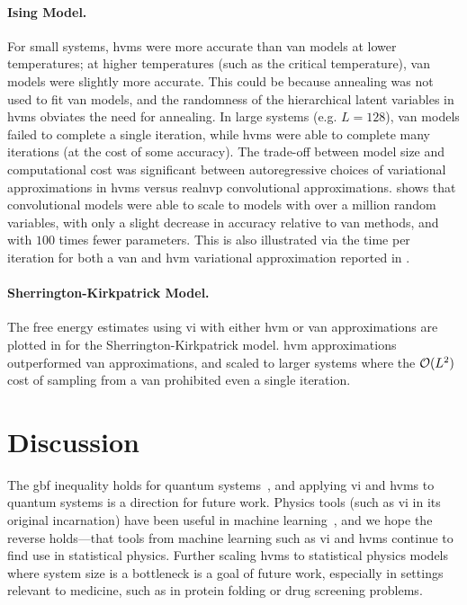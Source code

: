 \paragraph{Ising Model.} For small systems, \glspl{hvm} were more accurate than \gls{van} models at lower temperatures; at higher temperatures (such as the critical temperature), \gls{van} models were slightly more accurate. This could be because annealing was not used to fit \gls{van} models, and the randomness of the hierarchical latent variables in \glspl{hvm} obviates the need for annealing. In large systems (e.g. $L=128$), \gls{van} models failed to complete a single iteration, while \glspl{hvm} were able to complete many iterations (at the cost of some accuracy). The trade-off between model size and computational cost was significant between autoregressive choices of variational approximations in \glspl{hvm} versus \gls{realnvp} convolutional approximations.  shows that convolutional models were able to scale to models with over a million random variables, with only a slight decrease in accuracy relative to \gls{van} methods, and with $100$ times fewer parameters. This is also illustrated via the time per iteration for both a \gls{van} and \gls{hvm} variational approximation reported in .



\paragraph{Sherrington-Kirkpatrick Model.} The free energy estimates using \gls{vi} with either \gls{hvm} or \gls{van} approximations are plotted in  for the Sherrington-Kirkpatrick model. \gls{hvm} approximations outperformed \gls{van} approximations, and scaled to larger systems where the $\mathcal{O}(L^2)$ cost of sampling from a \gls{van} prohibited even a single iteration.

\section{Discussion}
The \gls{gbf} inequality holds for quantum systems~\citep{feynman1972statistical,feynman2018statistical}, and  applying \gls{vi} and \glspl{hvm} to quantum systems is a direction for future work. Physics tools (such as \gls{vi} in its original incarnation) have been useful in machine learning~\citep{bamler2017perturbative}, and we hope the reverse holds---that tools from machine learning such as \gls{vi} and \glspl{hvm} continue to find use in statistical physics. Further scaling \glspl{hvm} to statistical physics models where system size is a bottleneck is a goal of future work, especially in settings relevant to medicine, such as in protein folding or drug screening problems.